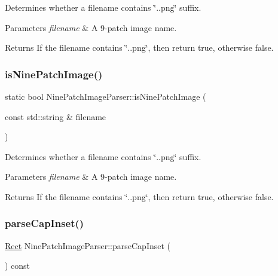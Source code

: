 Determines whether a filename contains \char`\"{}..\+png\char`\"{} suffix. 
\begin{DoxyParams}{Parameters}
{\em filename} & A 9-\/patch image name.\\
\hline
\end{DoxyParams}
\begin{DoxyReturn}{Returns}
If the filename contains \char`\"{}..\+png\char`\"{}, then return true, otherwise false. 
\end{DoxyReturn}
\mbox{\label{classNinePatchImageParser_a914715744d8e64528fda1e8fd004438d}} 
\subsubsection{\texorpdfstring{is\+Nine\+Patch\+Image()}{isNinePatchImage()}\hspace{0.1cm}{\footnotesize\ttfamily [2/2]}}
{\footnotesize\ttfamily static bool Nine\+Patch\+Image\+Parser\+::is\+Nine\+Patch\+Image (\begin{DoxyParamCaption}\item[{const std\+::string \&}]{filename }\end{DoxyParamCaption})\hspace{0.3cm}{\ttfamily [static]}}

Determines whether a filename contains \char`\"{}..\+png\char`\"{} suffix. 
\begin{DoxyParams}{Parameters}
{\em filename} & A 9-\/patch image name.\\
\hline
\end{DoxyParams}
\begin{DoxyReturn}{Returns}
If the filename contains \char`\"{}..\+png\char`\"{}, then return true, otherwise false. 
\end{DoxyReturn}
\mbox{\label{classNinePatchImageParser_a85313610f427ab890684f3c5fc4fe3c7}} 
\subsubsection{\texorpdfstring{parse\+Cap\+Inset()}{parseCapInset()}\hspace{0.1cm}{\footnotesize\ttfamily [1/2]}}
{\footnotesize\ttfamily \hyperlink{classRect}{Rect} Nine\+Patch\+Image\+Parser\+::parse\+Cap\+Inset (\begin{DoxyParamCaption}{ }\end{DoxyParamCaption}) const}

